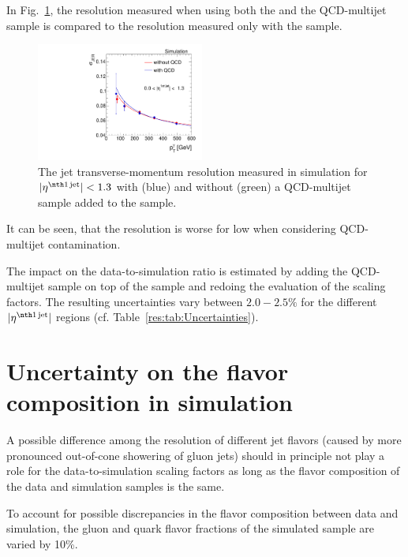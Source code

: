 In Fig.~\ref{res:fig:QCDuncertainty}, the resolution measured when using both the \GAMJET and the QCD-multijet sample is compared to the resolution measured only with the \GAMJET sample.
\begin{figure}[b]
  \centering
      \includegraphics[width=0.49\textwidth]{figures/resolution/systematicUncertainties/Resolution_for_1_eta_bin_QCDUncertainty_RMS99.pdf}
  \caption{The jet transverse-momentum resolution measured in simulation for $|\etafirstjet| < 1.3$ with (blue) and without (green) a QCD-multijet sample added to the \GAMJET sample.}  
  \label{res:fig:QCDuncertainty}
\end{figure}
It can be seen, that the resolution is worse for low \ptgamma when considering QCD-multijet contamination.

The impact on the data-to-simulation ratio is estimated by adding the QCD-multijet sample on top of the \GAMJET sample and redoing the evaluation of the scaling factors.
The resulting uncertainties vary between $2.0-2.5\%$ for the different $|\etafirstjet|$ regions (cf. Table~\ref{res:tab:Uncertainties}).

\section*{Uncertainty on the flavor composition in simulation}
A possible difference among the resolution of different jet flavors (caused by \eg more pronounced out-of-cone showering of gluon jets) 
should in principle not play a role for the data-to-simulation scaling factors \rhores as long as the flavor composition of the data and simulation samples is the same. 

To account for possible discrepancies in the flavor composition between data and simulation, the gluon and quark flavor fractions of the simulated sample are varied by 10\%.

